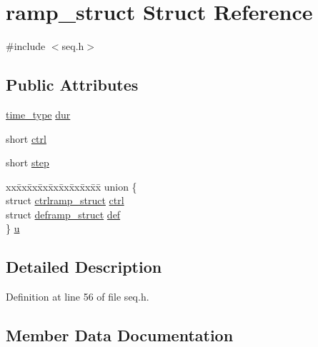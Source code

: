 \hypertarget{structramp__struct}{}\section{ramp\+\_\+struct Struct Reference}
\label{structramp__struct}


{\ttfamily \#include $<$seq.\+h$>$}

\subsection*{Public Attributes}
\begin{DoxyCompactItemize}
\item 
\hyperlink{midifns_8h_a3f787491db5dbc75c21b27d54e9ebae6}{time\+\_\+type} \hyperlink{structramp__struct_a90b783b1e8896c8d1c486f0217ddf4a9}{dur}
\item 
short \hyperlink{structramp__struct_a6c42d8fea6f5fe3c78720567f378f84a}{ctrl}
\item 
short \hyperlink{structramp__struct_a3e2627ae5c7347c6608db6f82635bcbd}{step}
\item 
\begin{tabbing}
xx\=xx\=xx\=xx\=xx\=xx\=xx\=xx\=xx\=\kill
union \{\\
\>struct \hyperlink{structctrlramp__struct}{ctrlramp\_struct} \hyperlink{structramp__struct_a4e0cae119e90c78b3d9cc1410d7f221e}{ctrl}\\
\>struct \hyperlink{structdeframp__struct}{deframp\_struct} \hyperlink{structramp__struct_af03e5115133e11ba0032e068b6964182}{def}\\
\} \hyperlink{structramp__struct_aeeb84f4d693d474dbd326781d42a8537}{u}\\

\end{tabbing}\end{DoxyCompactItemize}


\subsection{Detailed Description}


Definition at line 56 of file seq.\+h.



\subsection{Member Data Documentation}
